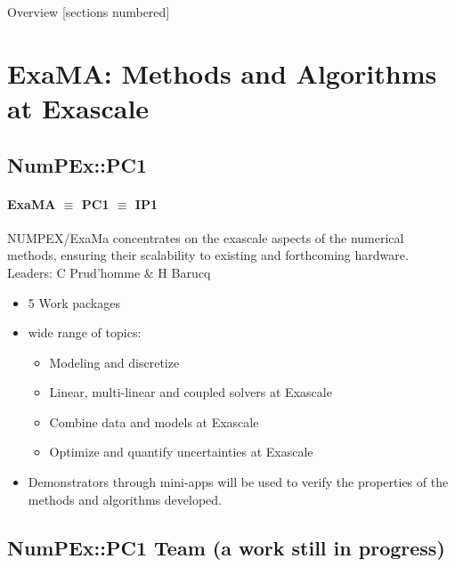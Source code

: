 \titleframe

\begin{frame}{Overview}
  [sections numbered]
  \tableofcontents[hideallsubsections]
\end{frame}


\section{ExaMA: Methods and Algorithms at Exascale}
\subsection{NumPEx::PC1}
\begin{frame}{\insertsectionhead}
  \framesubtitle{ExaMA $\equiv$ PC1 $\equiv$ IP1}
  NUMPEX/ExaMa concentrates on the exascale aspects of the numerical methods, ensuring their scalability to existing and forthcoming hardware.
  \vfill
  Leaders: C Prud'homme \& H Barucq
  \begin{itemize}
    \item 5 Work packages
    \item wide range of topics: 
    \begin{itemize}
        \item Modeling and discretize
        \item Linear, multi-linear and coupled solvers at Exascale
        \item Combine data and  models at Exascale
        \item Optimize and quantify uncertainties at Exascale
    \end{itemize}
    \item Demonstrators through mini-apps will be used to verify the properties of the methods and algorithms developed.
  \end{itemize}
\end{frame}

\subsection{NumPEx::PC1 Team (a work still in progress)}


